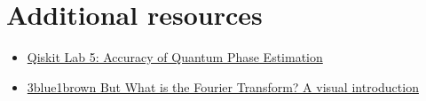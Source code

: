 \section{Additional resources}
\begin{itemize}
    \item \href{https://learn.qiskit.org/course/ch-labs/lab-5-accuracy-of-quantum-phase-estimation}{Qiskit Lab 5: Accuracy of Quantum Phase Estimation}

    \item \href{https://www.3blue1brown.com/lessons/fourier-transforms}{3blue1brown But What is the Fourier Transform? A visual introduction}
\end{itemize}
